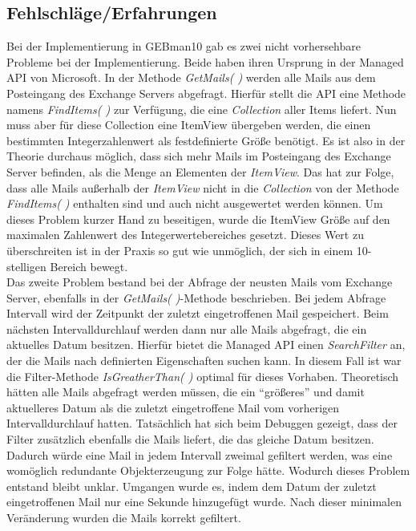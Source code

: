 \subsection{Fehlschläge/Erfahrungen}
\noindent
Bei der Implementierung in GEBman10 gab es zwei nicht vorhersehbare Probleme bei der Implementierung. Beide haben ihren Ursprung in der Managed API von Microsoft. In der Methode \textit{GetMails( )} werden alle Mails aus dem Posteingang des Exchange Servers abgefragt. Hierfür stellt die API eine Methode namens \textit{FindItems( )} zur Verfügung, die eine \textit{Collection} aller Items liefert. Nun muss aber für diese Collection eine ItemView übergeben werden, die einen bestimmten Integerzahlenwert als festdefinierte Größe benötigt. Es ist also in der Theorie durchaus möglich, dass sich mehr Mails im Posteingang des Exchange Server befinden, als die Menge an Elementen der \textit{ItemView}. Das hat zur Folge, dass alle Mails außerhalb der \textit{ItemView} nicht in die \textit{Collection} von der Methode \textit{FindItems( )} enthalten sind und auch nicht ausgewertet werden können. Um dieses Problem kurzer Hand zu beseitigen, wurde die ItemView Größe auf den maximalen Zahlenwert des Integerwertebereiches gesetzt. Dieses Wert zu überschreiten ist in der Praxis so gut wie unmöglich, der sich in einem 10-stelligen Bereich bewegt.\\

\noindent
Das zweite Problem bestand bei der Abfrage der neusten Mails vom Exchange Server, ebenfalls in der \textit{GetMails( )}-Methode beschrieben. Bei jedem Abfrage Intervall wird der Zeitpunkt der zuletzt eingetroffenen Mail gespeichert. Beim nächsten Intervalldurchlauf werden dann nur alle Mails abgefragt, die ein aktuelles Datum besitzen. Hierfür bietet die Managed API einen \textit{SearchFilter} an, der die Mails nach definierten Eigenschaften suchen kann. In diesem Fall ist war die Filter-Methode \textit{IsGreatherThan( )} optimal für dieses Vorhaben. Theoretisch hätten alle Mails abgefragt werden müssen, die ein \enquote{größeres} und damit aktuelleres Datum als die zuletzt eingetroffene Mail vom vorherigen Intervalldurchlauf hatten. Tatsächlich hat sich beim Debuggen gezeigt, dass der Filter zusätzlich ebenfalls die Mails liefert, die das gleiche Datum besitzen. Dadurch würde eine Mail in jedem Intervall zweimal gefiltert werden, was eine womöglich redundante Objekterzeugung zur Folge hätte. Wodurch dieses Problem entstand bleibt unklar. Umgangen wurde es, indem dem Datum der zuletzt eingetroffenen Mail nur eine Sekunde hinzugefügt wurde. Nach dieser minimalen Veränderung wurden die Mails korrekt gefiltert.


